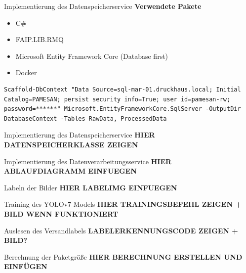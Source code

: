 \documentclass[10pt,ngerman]{beamer}
\begin{document}
\begin{frame}[fragile]{Implementierung des Datenspeicherservice}
  \textbf{Verwendete Pakete}
  \begin{itemize}
    \item C\#
    \item FAIP.LIB.RMQ
    \item Microsoft Entity Framework Core (Database first)
    \item Docker
  \end{itemize}

  \pause

  \begin{lstlisting}[style=bash-style,
    breaklines=true]
    Scaffold-DbContext "Data Source=sql-mar-01.druckhaus.local; Initial Catalog=PAMESAN; persist security info=True; user id=pamesan-rw; password=******" Microsoft.EntityFrameworkCore.SqlServer -OutputDir DatabaseContext -Tables RawData, ProcessedData
\end{lstlisting}
\end{frame}


\begin{frame}[fragile]{Implementierung des Datenspeicherservice}
  \textbf{HIER DATENSPEICHERKLASSE ZEIGEN}
\end{frame}


\begin{frame}[fragile]{Implementierung des Datenverarbeitungsservice}
  \textbf{HIER ABLAUFDIAGRAMM EINFUEGEN}
\end{frame}


\begin{frame}[fragile]{Labeln der Bilder}
  \textbf{HIER LABELIMG EINFUEGEN}
\end{frame}


\begin{frame}[fragile]{Training des YOLOv7-Models}
  \textbf{HIER TRAININGSBEFEHL ZEIGEN + BILD WENN FUNKTIONIERT}
\end{frame}


\begin{frame}[fragile]{Auslesen des Versandlabels}
  \textbf{LABELERKENNUNGSCODE ZEIGEN + BILD?}
\end{frame}


\begin{frame}[fragile]{Berechnung der Paketgröße}
  \textbf{HIER BERECHNUNG ERSTELLEN UND EINFÜGEN}
\end{frame}
\end{document}
